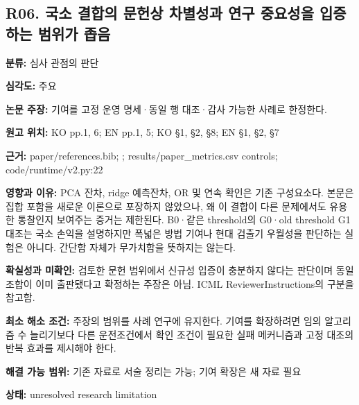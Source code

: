 \documentclass[11pt,a4paper]{article}
\begin{document}
\subsection*{R06. 국소 결합의 문헌상 차별성과 연구 중요성을 입증하는 범위가 좁음}
\textbf{분류:} 심사 관점의 판단
\par
\textbf{심각도:} 주요
\par
\textbf{논문 주장:} 기여를 고정 운영 명세·동일 행 대조·감사 가능한 사례로 한정한다.
\par
\textbf{원고 위치:} KO pp.1, 6; EN pp.1, 5; KO §1, §2, §8; EN §1, §2, §7
\par
\textbf{근거:} paper/references.bib; ; results/paper\_metrics.csv controls; code/runtime/v2.py:22
\par
\textbf{영향과 이유:} PCA 잔차, ridge 예측잔차, OR 및 연속 확인은 기존 구성요소다. 본문은 집합 포함을 새로운 이론으로 포장하지 않았으나, 왜 이 결합이 다른 문제에서도 유용한 통찰인지 보여주는 증거는 제한된다. B0·같은 threshold의 G0·old threshold G1 대조는 국소 손익을 설명하지만 폭넓은 방법 기여나 현대 검출기 우월성을 판단하는 실험은 아니다. 간단함 자체가 무가치함을 뜻하지는 않는다.
\par
\textbf{확실성과 미확인:} 검토한 문헌 범위에서 신규성 입증이 충분하지 않다는 판단이며 동일 조합이 이미 출판됐다고 확정하는 주장은 아님. ICML ReviewerInstructions의  구분을 참고함.
\par
\textbf{최소 해소 조건:} 주장의 범위를 사례 연구에 유지한다. 기여를 확장하려면 임의 알고리즘 수 늘리기보다 다른 운전조건에서 확인 조건이 필요한 실패 메커니즘과 고정 대조의 반복 효과를 제시해야 한다.
\par
\textbf{해결 가능 범위:} 기존 자료로 서술 정리는 가능; 기여 확장은 새 자료 필요
\par
\textbf{상태:} unresolved research limitation
\par
\end{document}
